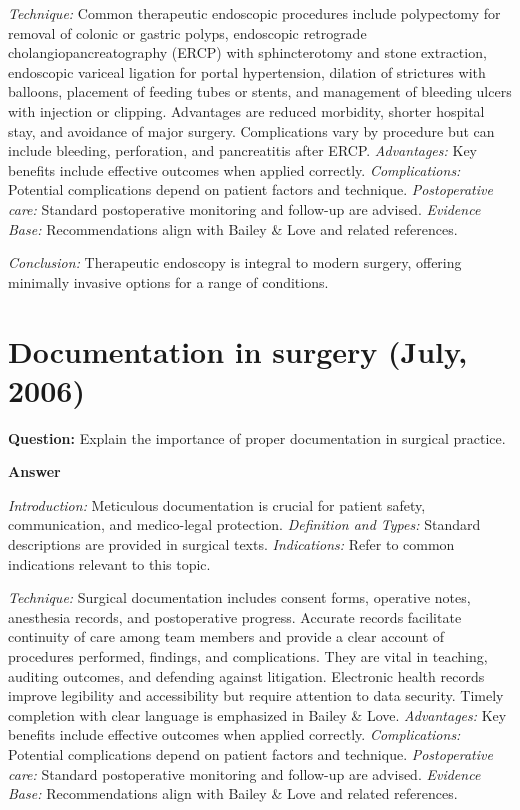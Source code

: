 \documentclass{article}
\begin{document}
\emph{Technique:} Common therapeutic endoscopic procedures include polypectomy for removal of colonic or gastric polyps, endoscopic retrograde cholangiopancreatography (ERCP) with sphincterotomy and stone extraction, endoscopic variceal ligation for portal hypertension, dilation of strictures with balloons, placement of feeding tubes or stents, and management of bleeding ulcers with injection or clipping. Advantages are reduced morbidity, shorter hospital stay, and avoidance of major surgery. Complications vary by procedure but can include bleeding, perforation, and pancreatitis after ERCP.
\emph{Advantages:} Key benefits include effective outcomes when applied correctly.
\emph{Complications:} Potential complications depend on patient factors and technique.
\emph{Postoperative care:} Standard postoperative monitoring and follow-up are advised.
\emph{Evidence Base:} Recommendations align with Bailey & Love and related references.

\emph{Conclusion:} Therapeutic endoscopy is integral to modern surgery, offering minimally invasive options for a range of conditions.


\section{Documentation in surgery (July, 2006)}

\textbf{Question:} Explain the importance of proper documentation in surgical practice.

\textbf{Answer}

\emph{Introduction:} Meticulous documentation is crucial for patient safety, communication, and medico-legal protection.
\emph{Definition and Types:} Standard descriptions are provided in surgical texts.
\emph{Indications:} Refer to common indications relevant to this topic.

\emph{Technique:} Surgical documentation includes consent forms, operative notes, anesthesia records, and postoperative progress. Accurate records facilitate continuity of care among team members and provide a clear account of procedures performed, findings, and complications. They are vital in teaching, auditing outcomes, and defending against litigation. Electronic health records improve legibility and accessibility but require attention to data security. Timely completion with clear language is emphasized in Bailey & Love.
\emph{Advantages:} Key benefits include effective outcomes when applied correctly.
\emph{Complications:} Potential complications depend on patient factors and technique.
\emph{Postoperative care:} Standard postoperative monitoring and follow-up are advised.
\emph{Evidence Base:} Recommendations align with Bailey & Love and related references.
\end{document}
